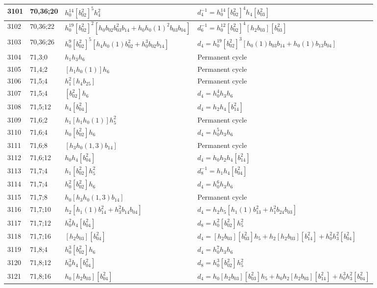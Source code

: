 \documentclass{article}
\begin{document}
\begin{longtable}{|l|l|>{\raggedright\arraybackslash}p{6cm}|>{\raggedright\arraybackslash}p{6cm}|}
\hline
3101 & 70,36;20 & $h_0^{14}[b_{02}^2]^5h_4^2$ & $d_{4}^{-1}=h_0^{14}[b_{02}^2]^4h_4[b_{03}^2]$\\
\hline
3102 & 70,36;22 & $h_0^{19}[b_{02}^2]^2[h_0b_{02}b_{03}^2b_{14} + h_0h_0(1)^2b_{03}b_{04}]$ & $d_{6}^{-1}=h_0^{12}[b_{02}^2]^4[h_2b_{03}][b_{03}^2]$\\
\hline
3103 & 70,36;26 & $h_0^9[b_{02}^2]^5[h_4h_0(1)b_{02}^2 + h_0^3b_{02}b_{14}]$ &$d_{4}=h_0^{19}[b_{02}^2]^3[h_0(1)b_{03}b_{14} + h_0(1)b_{13}b_{04}]$\\
\hline
3104 & 71,3;0 & $h_1h_3h_6$ & Permanent cycle\\
\hline
3105 & 71,4;2 & $[h_1h_0(1)]h_6$ & Permanent cycle\\
\hline
3106 & 71,5;4 & $h_1^2[h_4b_{25}]$ & Permanent cycle\\
3107 & 71,5;4 & $[b_{02}^2]h_6$ &$d_{4}=h_0^4h_3h_6$\\
\hline
3108 & 71,5;12 & $h_4[b_{04}^2]$ &$d_{4}=h_2h_4[b_{14}^2]$\\
\hline
3109 & 71,6;2 & $h_1[h_1h_0(1)]h_5^2$ & Permanent cycle\\
\hline
3110 & 71,6;4 & $h_0[b_{02}^2]h_6$ &$d_{4}=h_0^5h_3h_6$\\
\hline
3111 & 71,6;8 & $[h_3h_0(1, 3)b_{14}]$ & Permanent cycle\\
\hline
3112 & 71,6;12 & $h_0h_4[b_{04}^2]$ &$d_{4}=h_0h_2h_4[b_{14}^2]$\\
\hline
3113 & 71,7;4 & $h_1[b_{02}^2]h_5^2$ & $d_{8}^{-1}=h_1h_4[b_{04}^2]$\\
3114 & 71,7;4 & $h_0^2[b_{02}^2]h_6$ &$d_{4}=h_0^6h_3h_6$\\
\hline
3115 & 71,7;8 & $h_0[h_3h_0(1, 3)b_{14}]$ & Permanent cycle\\
\hline
3116 & 71,7;10 & $h_2[h_1(1)b_{14}^2 + h_3^2b_{14}b_{04}]$ &$d_{4}=h_2h_5[h_1(1)b_{13}^2 + h_1^2b_{24}b_{03}]$\\
\hline
3117 & 71,7;12 & $h_0^2h_4[b_{04}^2]$ &$d_{8}=h_0^2[b_{02}^2]h_5^2$\\
\hline
3118 & 71,7;16 & $[h_2b_{03}][b_{04}^2]$ &$d_{4}=[h_2b_{03}][b_{03}^2]h_5 + h_2[h_2b_{03}][b_{14}^2] + h_0^2h_3^2[b_{04}^2]$\\
\hline
3119 & 71,8;4 & $h_0^3[b_{02}^2]h_6$ &$d_{4}=h_0^7h_3h_6$\\
\hline
3120 & 71,8;12 & $h_0^3h_4[b_{04}^2]$ &$d_{8}=h_0^3[b_{02}^2]h_5^2$\\
\hline
3121 & 71,8;16 & $h_0[h_2b_{03}][b_{04}^2]$ &$d_{4}=h_0[h_2b_{03}][b_{03}^2]h_5 + h_0h_2[h_2b_{03}][b_{14}^2] + h_0^3h_3^2[b_{04}^2]$\\

\end{longtable}
\end{document}
